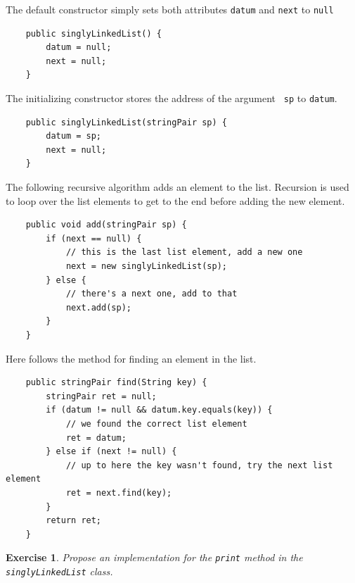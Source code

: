 \documentclass[a4paper]{book}
\theoremstyle{changebreak}                %
\newtheorem{ex}[result]{Exercise}
\begin{document}
The default constructor simply sets both attributes
{\tt datum} and {\tt next} to {\tt null}
\begin{verbatim}
    public singlyLinkedList() {
        datum = null;
        next = null;
    }
\end{verbatim}
The initializing constructor stores the address of the argument {\tt
  sp} to {\tt datum}.
\begin{verbatim}
    public singlyLinkedList(stringPair sp) {
        datum = sp;
        next = null;
    }
\end{verbatim}
The following recursive algorithm adds an element to the
list. Recursion is used to loop over the list elements to get to the
end before adding the new element.
\begin{verbatim}
    public void add(stringPair sp) {
        if (next == null) {
            // this is the last list element, add a new one
            next = new singlyLinkedList(sp);
        } else {
            // there's a next one, add to that
            next.add(sp);
        }
    }
\end{verbatim}
Here follows the method for finding an element in the list.
\begin{verbatim}
    public stringPair find(String key) {
        stringPair ret = null;
        if (datum != null && datum.key.equals(key)) {
            // we found the correct list element
            ret = datum;
        } else if (next != null) {
            // up to here the key wasn't found, try the next list element
            ret = next.find(key);
        }
        return ret;
    }
\end{verbatim}

\begin{ex}
Propose an implementation for the {\tt print} method in the {\tt
  singlyLinkedList} class.
\end{ex}
\end{document}
